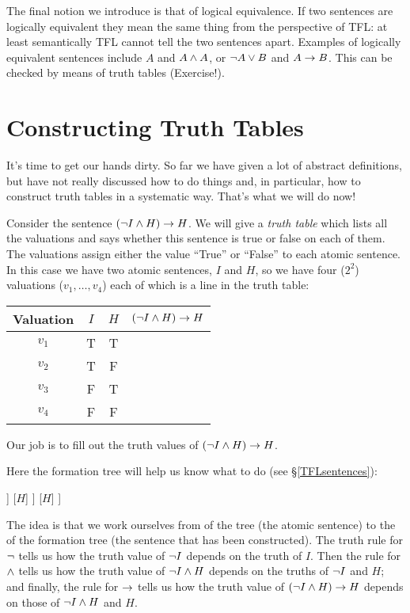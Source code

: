 The final notion we introduce is that of logical equivalence.
If two sentences are logically equivalent they mean the same thing from the perspective of TFL: at least semantically TFL cannot tell the two sentences apart. Examples of logically equivalent sentences include $A$ and $A\mathbin{\wedge} A$, or $\neg A\vee B$ and $A\rightarrow B$. This can be checked by means of truth tables (Exercise!).



\section{Constructing Truth Tables}\label{sec:ctt}
It's time to get our hands dirty. So far we have given a lot of abstract definitions, but have not really discussed how to do things and, in particular, how to construct truth tables in a systematic way. That's what we will do now!


Consider the sentence $(\enot I\eand H)\eif H$. We will give a \emph{truth table} which lists all the valuations and says whether this sentence is true or false on each of them.
The valuations assign either the value ``True'' or ``False'' to each atomic sentence. In this case we have two atomic sentences, $I$ and $H$, so we have four ($2^2$) valuations ($v_1,\dots,v_4$) each of which is a line in the truth table:
\begin{center}
\begin{tabular}{c|cc|c}
Valuation&$I$&$H$&$(\enot I\eand H)\eif H$\\\hline
$v_1$&T&T&\\
$v_2$&T&F&\\
$v_3$&F&T&\\
$v_4$&F&F&
\end{tabular}
\end{center}
Our job is to fill out the truth values of $(\enot I\eand H)\eif H$.

Here the formation tree will help us know what to do (see \S\ref{TFLsentences}):
\begin{center}
\begin{forest}
[$(\enot I\eand H)\eif H$
	[$(\enot I\eand H)$
		[$\enot I$
			[$I$]
		]
		[$H$]
	]
	[$H$]
]
\end{forest}
\end{center}
The idea is that we work ourselves from  of the tree (the atomic sentence) to the  of the formation tree (the sentence that has been constructed). The truth rule for $\neg$ tells us how the truth value of $\enot I$ depends on the truth of $I$. Then the rule for $\mathbin{\wedge}$ tells us how the truth value of $\neg I\mathbin{\wedge} H$ depends on the truths of $\enot I$ and $H$; and finally, the rule for $\rightarrow$ tells us how the truth value of $(\enot I\eand H)\eif H$ depends on those of $\neg I\mathbin{\wedge} H$ and $H$.


